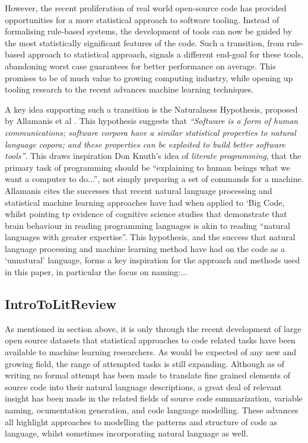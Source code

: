 However, the recent proliferation of real world open-source code has provided opportunities for a more statistical approach to software tooling. 
Instead of formalising rule-based systems, the development of tools can now be guided by the most statistically significant features of the code.
Such a transition, from rule-based approach to statistical approach, signals a different end-goal for these tools, abandoning worst case guarantees for better performance on average. %
This promises to be of much value to growing computing industry, while opening up tooling research to the recent advances machine learning techniques.
 
A key idea supporting such a transition is the Naturalness Hypothesis, proposed by Allamanis et al \cite{allamanis_mining_nodate}. 
This hypothesis suggests that \textit{``Software is a form of human communications; software corpora have a similar statistical properties to natural language copora; and these properties can be exploited to build better software tools''}.\cite{allamanis_mining_nodate} 
This draws inspiration Don Knuth's idea of \textit{literate programming}\cite{knuth_literate_1984}, that the primary task of programming should be ``explaining to human beings what we want a computer to do...''\cite{knuth_literate_1984}, not simply preparing a set of commands for a machine.
Allamanis cites the successes that recent natural language processing and statistical machine learning approaches have had when applied to `Big Code, whilst pointing tp evidence of cognitive science studies that demonstrate that brain behaviour in reading programming languages is akin to reading ``natural languages with greater expertise''\cite{floyd_decoding_2017}.
This hypothesis, and the success that natural language processing and machine learning method have had on the code as a `unnatural' language,  forms a key inspiration for the approach and methods used in this paper, in particular the focus on naming:...


\subsection{IntroToLitReview} %
\label{sub:introtolitreview}

As mentioned in section above, it is only through the recent development of large open source datasets that statistical approaches to code related tasks have been available to machine learning researchers. 
As would be expected of any new and growing field, the range of attempted tasks is still expanding. 
Although as of writing no formal attempt has been made to translate fine grained elements of source code into their natural language descriptions, a great deal of relevant insight has been made in the related fields of source code summarization, variable naming, ocumentation generation, and code language modelling. 
These advances all highlight approaches to modelling the patterns and structure of code as language, whilst sometimes incorporating natural language as well. 

